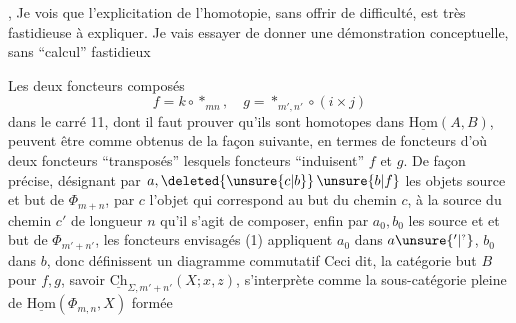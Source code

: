 , Je vois que l'explicitation de l'homotopie, sans offrir de difficulté, est très fastidieuse à expliquer. Je  vais essayer de donner une démonstration conceptuelle, sans ``calcul'' fastidieux


Les deux foncteurs composés
\[
f=k\circ *_{mn},\quad g=*_{m',n'}\circ(i\times j)
\]
dans le  carré  11, dont il faut prouver qu'ils sont homotopes\unsure{,} dans $\underline{\mathrm{Hom}}(A,B)$, peuvent être  comme obtenus de la façon suivante, en termes de  foncteurs 
d'où deux foncteurs ``transposés''
lesquels foncteurs ``induisent'' $f$ et $g$. De façon précise, désignant par $a,\deleted{\unsure{c|b}}\,\unsure{b|f}$ les objets source et but de $\Phi_{m+n}$, par $c$ l'objet qui correspond au but du chemin $c$,  à la source du chemin $c'$ de longueur $n$ qu'il s'agit de composer, enfin par $a_0,b_0$ les  source et et but de $\Phi_{m'+n'}$, les foncteurs envisagés (1) appliquent $a_0$ dans $a\unsure{{}^{\prime}|{}^{\scriptscriptstyle ?}}$, $b_0$ dans $b$, donc définissent  un diagramme commutatif
Ceci dit, la catégorie but $B$ pour $f,g$, savoir $\underline{\mathrm{Ch}}_{\Sigma,m'+n'}(X;x,z)$, s'interprète comme la sous-catégorie pleine de $\underline{\mathrm{Hom}}(\Phi_{m,n},X)$  formée

